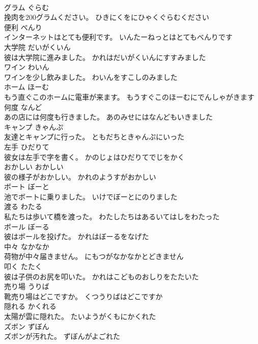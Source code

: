 \documentclass[8pt]{extreport}
\begin{document}
\begin{CJK}{UTF8}{min}
\\	グラム	ぐらむ	
\\	挽肉を200グラムください。	ひきにくをにひゃくぐらむください	
\\	便利	べんり	
\\	インターネットはとても便利です。	いんたーねっとはとてもべんりです	
\\	大学院	だいがくいん	
\\	彼は大学院に進みました。	かれはだいがくいんにすすみました	
\\	ワイン	わいん	
\\	ワインを少し飲みました。	わいんをすこしのみました	
\\	ホーム	ほーむ	
\\	もう直ぐこのホームに電車が来ます。	もうすぐこのほーむにでんしゃがきます	
\\	何度	なんど	
\\	あの店には何度も行きました。	あのみせにはなんどもいきました	
\\	キャンプ	きゃんぷ	
\\	友達とキャンプに行った。	ともだちときゃんぷにいった	
\\	左手	ひだりて	
\\	彼女は左手で字を書く。	かのじょはひだりてでじをかく	
\\	おかしい	おかしい	
\\	彼の様子がおかしい。	かれのようすがおかしい	
\\	ボート	ぼーと	
\\	池でボートに乗りました。	いけでぼーとにのりました	
\\	渡る	わたる	
\\	私たちは歩いて橋を渡った。	わたしたちはあるいてはしをわたった	
\\	ボール	ぼーる	
\\	彼はボールを投げた。	かれはぼーるをなげた	
\\	中々	なかなか	
\\	荷物が中々届きません。	にもつがなかなかとどきません	
\\	叩く	たたく	
\\	彼は子供のお尻を叩いた。	かれはこどものおしりをたたいた	
\\	売り場	うりば	
\\	靴売り場はどこですか。	くつうりばはどこですか	
\\	隠れる	かくれる	
\\	太陽が雲に隠れた。	たいようがくもにかくれた	
\\	ズボン	ずぼん	
\\	ズボンが汚れた。	ずぼんがよごれた	

\end{CJK}
\end{document}
